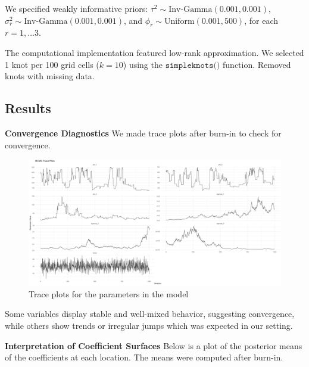We specified weakly informative priors: $\tau^2 \sim \text{Inv-Gamma}(0.001, 0.001)$, \newline $\sigma_r^2 \sim \text{Inv-Gamma}(0.001, 0.001)$, and $\phi_r \sim \text{Uniform}(0.001, 500)$, for each $r = 1, \dots 3$.

The computational implementation featured low-rank approximation. We selected 1 knot per 100 grid cells ($k=10$) using the  $\texttt{simpleknots()}$ function. Removed knots with missing data.
\subsection{Results}
\textbf{Convergence Diagnostics}\newline
We made trace plots after burn-in to check for convergence. 

\begin{figure}[H]
 \centering
 \includegraphics[width=\textwidth]{../../figures/traceplots.png}
 \caption{Trace plots for the parameters in the model}
 \label{fig:traceplots}
 \end{figure}
Some variables display stable and well-mixed behavior, suggesting convergence, while others show trends or irregular jumps which was expected in our setting.

\textbf{Interpretation of Coefficient Surfaces} \newline
Below is a plot of the posterior means of the coefficients at each location. The means were computed after burn-in.

